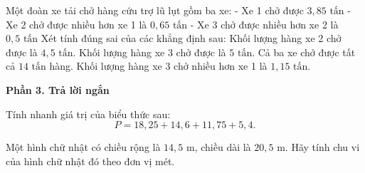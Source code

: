 \begin{ex} %
Một đoàn xe tải chở hàng cứu trợ lũ lụt gồm ba xe:
- Xe 1 chở được $3{,}85\text{ tấn}$
- Xe 2 chở được nhiều hơn xe 1 là $0{,}65\text{ tấn}$
- Xe 3 chở được nhiều hơn xe 2 là $0{,}5\text{ tấn}$
Xét tính đúng sai của các khẳng định sau:
\choiceTF
{\True Khối lượng hàng xe 2 chở được là $4{,}5\text{ tấn}$.}
{\True Khối lượng hàng xe 3 chở được là $5\text{ tấn}$.}
{Cả ba xe chở được tất cả $14\text{ tấn}$ hàng.}
{\True Khối lượng hàng xe 3 chở nhiều hơn xe 1 là $1{,}15\text{ tấn}$.}
\end{ex}

\textbf{Phần 3. Trả lời ngắn}

\begin{ex} %
Tính nhanh giá trị của biểu thức sau:
\[
P = 18{,}25 + 14{,}6 + 11{,}75 + 5{,}4.
\]
\end{ex}

\begin{ex} %
Một hình chữ nhật có chiều rộng là $14{,}5\text{ m}$, chiều dài là $20{,}5\text{ m}$. Hãy tính chu vi của hình chữ nhật đó theo đơn vị mét.
\end{ex}


